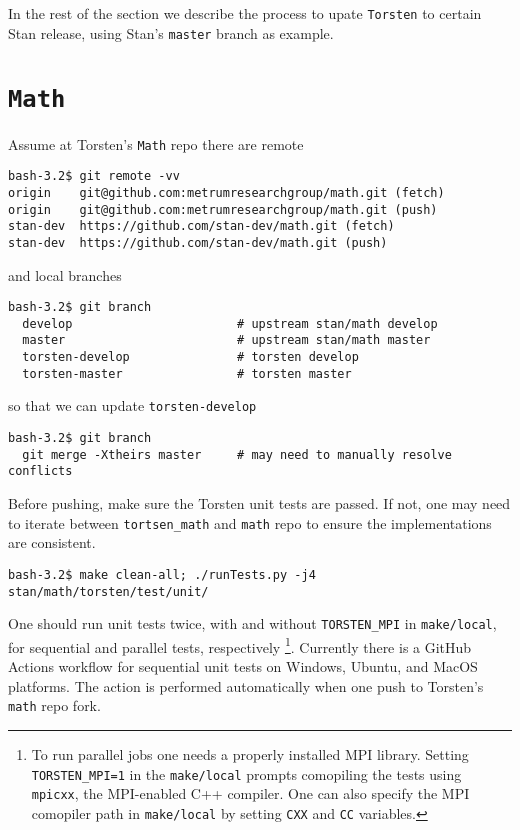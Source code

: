 \documentclass[12pt, reqno, oneside]{amsbook}
\numberwithin{equation}{chapter}
\numberwithin{figure}{chapter}
\numberwithin{table}{chapter}
\theoremstyle{remark}
\begin{document}
In the rest of the section we describe the process to upate \texttt{Torsten}
to certain Stan release, using Stan's \texttt{master} branch as example.

\section{\texttt{Math}}
\label{sec:org8bcb265}
Assume at Torsten's \texttt{Math} repo there are remote
\begin{verbatim}
bash-3.2$ git remote -vv
origin    git@github.com:metrumresearchgroup/math.git (fetch)
origin    git@github.com:metrumresearchgroup/math.git (push)
stan-dev  https://github.com/stan-dev/math.git (fetch)
stan-dev  https://github.com/stan-dev/math.git (push)
\end{verbatim}
and local branches
\begin{verbatim}
bash-3.2$ git branch
  develop                       # upstream stan/math develop
  master                        # upstream stan/math master
  torsten-develop               # torsten develop
  torsten-master                # torsten master
\end{verbatim}
so that we can update \texttt{torsten-develop}
\begin{verbatim}
bash-3.2$ git branch
  git merge -Xtheirs master     # may need to manually resolve conflicts
\end{verbatim}
Before pushing, make sure the Torsten unit tests are passed. If not,
one may need to iterate between \texttt{tortsen\_math} and \texttt{math} repo to
ensure the implementations are consistent.
\begin{verbatim}
bash-3.2$ make clean-all; ./runTests.py -j4 stan/math/torsten/test/unit/
\end{verbatim}
One should run unit tests twice, with and without \texttt{TORSTEN\_MPI} in
\texttt{make/local}, for sequential and parallel tests, respectively \footnote{To run parallel jobs one needs a properly installed MPI
library. Setting \texttt{TORSTEN\_MPI=1} in the \texttt{make/local} prompts
comopiling the tests using \texttt{mpicxx}, the MPI-enabled C++ compiler. One
can also specify the MPI comopiler path in \texttt{make/local} by setting
\texttt{CXX} and \texttt{CC} variables.}.
Currently there is a GitHub Actions workflow for sequential unit tests
on Windows, Ubuntu, and MacOS platforms. The action is performed
automatically when one push to Torsten's \texttt{math} repo fork.
\end{document}
